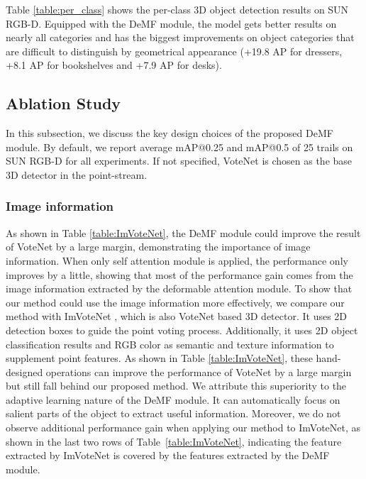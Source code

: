 \documentclass[runningheads]{llncs}
\begin{document}
Table \ref{table:per_class} shows the per-class 3D object detection results on SUN RGB-D. Equipped with the DeMF module, the model gets better results on nearly all categories and has the biggest improvements on object categories that are difficult to distinguish by geometrical appearance (+19.8 AP for dressers, +8.1 AP for bookshelves and +7.9 AP for desks).



\subsection{Ablation Study}
In this subsection, we discuss the key design choices of the proposed DeMF module. By default, we report average mAP@0.25 and mAP@0.5 of 25 trails on SUN RGB-D for all experiments. If not specified, VoteNet is chosen as the base 3D detector in the point-stream.

\subsubsection{Image information}

As shown in Table \ref{table:ImVoteNet}, the DeMF module could improve the result of VoteNet by a large margin, demonstrating the importance of image information. When only self attention module is applied, the performance only improves by a little, showing that most of the performance gain comes from the image information extracted by the deformable attention module. To show that our method could use the image information more effectively, we compare our method with ImVoteNet \cite{qi2020imvotenet}, which is also VoteNet based 3D detector. It uses 2D detection boxes to guide the point voting process. Additionally, it uses 2D object classification results and RGB color as semantic and texture information to supplement point features. As shown in Table \ref{table:ImVoteNet}, these hand-designed operations can improve the performance of VoteNet by a large margin but still fall behind our proposed method. We attribute this superiority to the adaptive learning nature of the DeMF module. It can automatically focus on salient parts of the object to extract useful information. Moreover, we do not observe additional performance gain when applying our method to ImVoteNet, as shown in the last two rows of Table~\ref{table:ImVoteNet}, indicating the feature extracted by ImVoteNet is covered by the features extracted by the DeMF module. 
\end{document}
